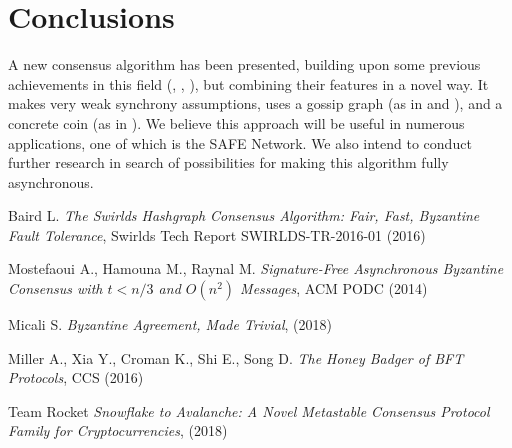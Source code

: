 \documentclass[a4paper,fleqn]{article}
\begin{document}
\section{Conclusions}

A new consensus algorithm has been presented, building upon some previous achievements in this
field (\cite{hg}, \cite{aba}, \cite{trivial}), but combining their features in a novel way. It
makes very weak synchrony assumptions, uses a gossip graph (as in \cite{hg} and \cite{snowflake}),
and a concrete coin (as in \cite{trivial}). We believe this approach will be useful in numerous
applications, one of which is the SAFE Network.
We also intend to conduct further research in search of possibilities for making this algorithm
fully asynchronous.

\label{references}

\begin{thebibliography}{4}

 Baird L. \textit{The Swirlds Hashgraph Consensus Algorithm: Fair, Fast, Byzantine
	Fault Tolerance}, Swirlds Tech Report SWIRLDS-TR-2016-01 (2016)

 Mostefaoui A., Hamouna M., Raynal M. \textit{Signature-Free Asynchronous Byzantine
	Consensus with $t < n/3$ and $O(n^2)$ Messages}, ACM PODC (2014)

 Micali S. \textit{Byzantine Agreement, Made Trivial}, (2018)

 Miller A., Xia Y., Croman K., Shi E., Song D. \textit{The Honey Badger of BFT
	Protocols}, CCS (2016)

 Team Rocket \textit{Snowflake to Avalanche: A Novel Metastable Consensus
	Protocol Family for Cryptocurrencies}, (2018)

\end{thebibliography}
\end{document}
